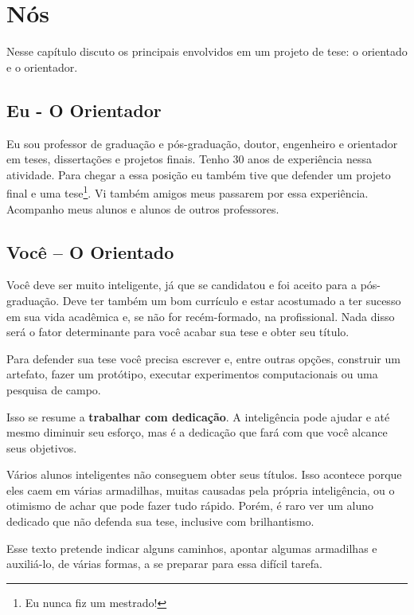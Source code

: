 \chapter{Nós}

Nesse capítulo discuto os principais envolvidos em um projeto de tese: o orientado e o orientador.

\section{Eu - O Orientador}

Eu sou professor de graduação e pós-graduação, doutor, engenheiro e orientador em teses, dissertações e projetos finais. Tenho 30 anos de experiência nessa atividade. Para chegar a essa posição eu também tive que defender um projeto final e uma tese\footnote{Eu nunca fiz um mestrado!}. Vi também amigos meus passarem por essa experiência. Acompanho meus alunos e alunos de outros professores.

\section{Você – O Orientado}

Você deve ser muito inteligente, já que se candidatou e foi aceito para a pós-graduação. Deve ter também um bom currículo e estar acostumado a ter sucesso em sua vida acadêmica e, se não for recém-formado, na profissional.
Nada disso será o fator determinante para você acabar sua tese e obter seu título.

Para defender sua tese você precisa escrever e, entre outras opções, construir um artefato, fazer um protótipo, executar experimentos computacionais ou uma pesquisa de campo.

Isso se resume a \textbf{trabalhar com dedicação}. A inteligência pode ajudar e até mesmo diminuir seu esforço, mas é a dedicação que fará com que você alcance seus objetivos.

Vários alunos inteligentes não conseguem obter seus títulos. Isso acontece porque eles caem em várias armadilhas, muitas causadas pela própria inteligência, ou o otimismo de achar que pode fazer tudo rápido. Porém, é raro ver um aluno dedicado que não defenda sua tese, inclusive com brilhantismo.

Esse texto pretende indicar alguns caminhos, apontar algumas armadilhas e auxiliá-lo, de várias formas, a se preparar para essa difícil tarefa.

